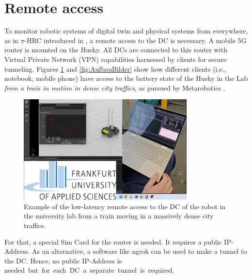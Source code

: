 \documentclass[conference]{IEEEtran}
\begin{document}
\section{Remote access}
 To monitor  robotic systems of digital twin and physical systems from everywhere, as in $\pi$-HRC introduced in \cite{kaigom2023metarobotics}, a remote access to the DC is necessary.
A mobile 5G router is mounted on the Husky. All DCs are connected to this router with Virtual Private Network (VPN) capabilities harnessed by  clients for secure tunneling. 
Figures \ref{fig:RemoteAccess} and \ref{fig:AufbauBilder} show how different clients (i.e., notebook, mobile phone) have access to the battery state of the Husky in the Lab \textit{from a train in motion in dense city traffics}, as pursued by Metarobotics \cite{kaigom2023metarobotics}.
\begin{figure}[htbp]
    \centerline{\includegraphics[width=8.9cm]{Pictures/ZugZugriff.png}}
    \caption{Example of the low-latency remote access to the DC of the robot in the university lab from a train moving in a massively dense city traffics.}
    \label{fig:RemoteAccess}
\end{figure}
For that, a special Sim Card for the router is needed.
It requires a public IP-Address. %
As an alternative, a software like ngrok can be used  to make a tunnel to the DC. Hence, no public IP-Address is \mbox{needed but for each DC a separate tunnel is required.}
\end{document}
